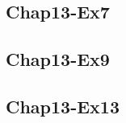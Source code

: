 \documentclass[12pt,a4paper]{article}
\begin{document}
\subsection{Chap13-Ex7}\label{sec:ex7_code}



\subsection{Chap13-Ex9}\label{sec:ex9_code}



\subsection{Chap13-Ex13}\label{sec:ex13_code}


\end{document}
